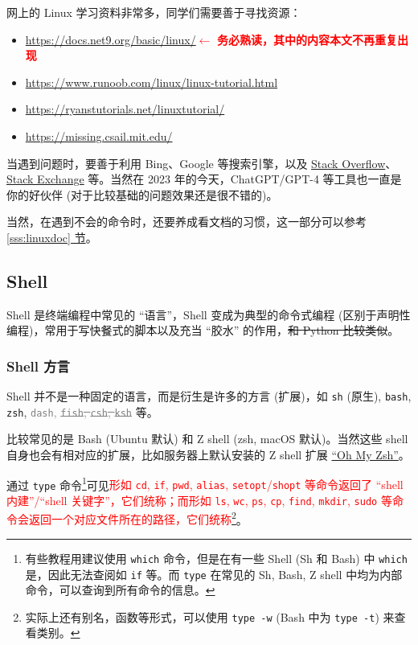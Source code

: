 \documentclass{article}
\begin{document}
	网上的 Linux 学习资料非常多，同学们需要善于寻找资源：

	\begin{itemize}
		\itemsep0pt
		\item \url{https://docs.net9.org/basic/linux/}\quad\textcolor{red}{$\gets$ \textbf{务必熟读，其中的内容本文不再重复出现}}
		\item \url{https://www.runoob.com/linux/linux-tutorial.html}
		\item \url{https://ryanstutorials.net/linuxtutorial/}
		\item \url{https://missing.csail.mit.edu/}
	\end{itemize}

	当遇到问题时，要善于利用 Bing、Google 等搜索引擎，以及 \href{https://stackoverflow.com/}{Stack Overflow}、\href{https://stackexchange.com/}{Stack Exchange} 等。当然在 2023 年的今天，ChatGPT/GPT-4 等工具也一直是你的好伙伴 (对于比较基础的问题效果还是很不错的)。

	当然，在遇到不会的命令时，还要养成看文档的习惯，这一部分可以参考 \hyperref[sss:linuxdoc]{\ref*{sss:linuxdoc} 节}。

	\subsection{Shell}

	Shell 是终端编程中常见的 ``语言''，Shell 变成为典型的命令式编程 (区别于声明性编程)，常用于写快餐式的脚本以及充当 ``胶水'' 的作用，\sout{和 Python 比较类似}。

	\subsubsection{Shell 方言}

	Shell 并不是一种固定的语言，而是衍生是许多的方言 (扩展)，如 \texttt{sh} (原生), \texttt{bash}, \texttt{zsh}, \textcolor{gray}{\texttt{dash}, \sout{\texttt{fish}, \texttt{csh}, \texttt{ksh}}} 等。

	比较常见的是 Bash (Ubuntu 默认) 和 Z shell (zsh, macOS 默认)。当然这些 shell 自身也会有相对应的扩展，比如服务器上默认安装的 Z shell 扩展 \href{https://ohmyz.sh/}{``Oh My Zsh''}。

	通过 \texttt{type} 命令\footnote{有些教程用建议使用 \texttt{which} 命令，但是在有一些 Shell (Sh 和 Bash) 中 \texttt{which} 是，因此无法查阅如 \texttt{if} 等。而 \texttt{type} 在常见的 Sh, Bash, Z shell 中均为内部命令，可以查询到所有命令的信息。}可见\textcolor{red}{形如 \texttt{cd}, \texttt{if}, \texttt{pwd}, \texttt{alias}, \texttt{setopt}/\texttt{shopt} 等命令返回了 ``shell 内建''/``shell 关键字''，它们统称；而形如 \texttt{ls}, \texttt{wc}, \texttt{ps}, \texttt{cp}, \texttt{find}, \texttt{mkdir}, \texttt{sudo} 等命令会返回一个对应文件所在的路径，它们统称}\footnote{实际上还有别名，函数等形式，可以使用 \texttt{type -w} (Bash 中为 \texttt{type -t}) 来查看类别。}。%
\end{document}
